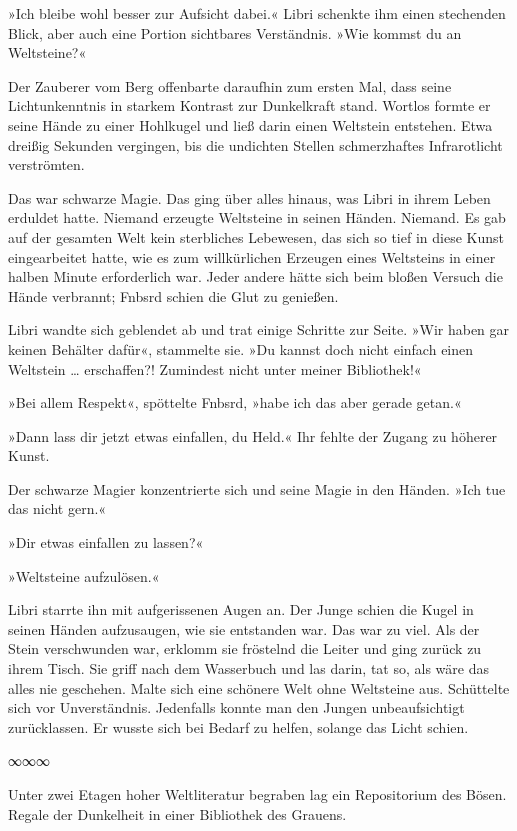 »Ich bleibe wohl besser zur Aufsicht dabei.« Libri schenkte ihm einen stechenden Blick, aber auch eine Portion sichtbares Verständnis. »Wie kommst du an Weltsteine?«

Der Zauberer vom Berg offenbarte daraufhin zum ersten Mal, dass seine Lichtunkenntnis in starkem Kontrast zur Dunkelkraft stand. Wortlos formte er seine Hände zu einer Hohlkugel und ließ darin einen Weltstein entstehen. Etwa dreißig Sekunden vergingen, bis die undichten Stellen schmerzhaftes Infrarotlicht verströmten.

Das war schwarze Magie. Das ging über alles hinaus, was Libri in ihrem Leben erduldet hatte. Niemand erzeugte Weltsteine in seinen Händen. Niemand. Es gab auf der gesamten Welt kein sterbliches Lebewesen, das sich so tief in diese Kunst eingearbeitet hatte, wie es zum willkürlichen Erzeugen eines Weltsteins in einer halben Minute erforderlich war. Jeder andere hätte sich beim bloßen Versuch die Hände verbrannt; Fnbsrd schien die Glut zu genießen.

Libri wandte sich geblendet ab und trat einige Schritte zur Seite. »Wir haben gar keinen Behälter dafür«, stammelte sie. »Du kannst doch nicht einfach einen Weltstein … erschaffen?! Zumindest nicht unter meiner Bibliothek!«

»Bei allem Respekt«, spöttelte Fnbsrd, »habe ich das aber gerade getan.«

»Dann lass dir jetzt etwas einfallen, du Held.« Ihr fehlte der Zugang zu höherer Kunst.

Der schwarze Magier konzentrierte sich und seine Magie in den Händen. »Ich tue das nicht gern.«

»Dir etwas einfallen zu lassen?«

»Weltsteine aufzulösen.«

Libri starrte ihn mit aufgerissenen Augen an. Der Junge schien die Kugel in seinen Händen aufzusaugen, wie sie entstanden war. Das war zu viel. Als der Stein verschwunden war, erklomm sie fröstelnd die Leiter und ging zurück zu ihrem Tisch. Sie griff nach dem Wasserbuch und las darin, tat so, als wäre das alles nie geschehen. Malte sich eine schönere Welt ohne Weltsteine aus. Schüttelte sich vor Unverständnis. Jedenfalls konnte man den Jungen unbeaufsichtigt zurücklassen. Er wusste sich bei Bedarf zu helfen, solange das Licht schien.

\begin{center}
∞∞∞
\end{center}

Unter zwei Etagen hoher Weltliteratur begraben lag ein Repositorium des Bösen. Regale der Dunkelheit in einer Bibliothek des Grauens.

